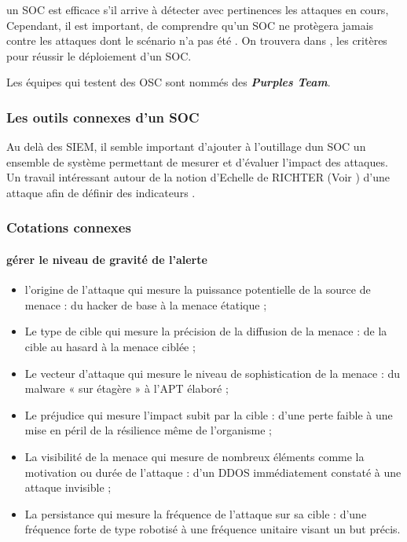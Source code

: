 
un SOC est efficace s’il arrive à détecter avec pertinences les attaques en cours,  Cependant, il est important, de comprendre qu’un SOC ne protègera jamais contre les attaques dont le scénario n'a pas été . On trouvera dans , les critères pour réussir le déploiement d'un SOC.

Les équipes qui testent des OSC sont nommés des \textbf{\textit{Purples Team}}.

\subsubsection{Les outils connexes d'un SOC}

Au delà des SIEM, il semble important d'ajouter à l'outillage dun SOC un ensemble de système permettant de mesurer et d'évaluer l'impact des attaques. Un travail intéressant autour de la notion d'Echelle de RICHTER (Voir  ) d'une attaque afin de définir des indicateurs .

\begin{frame}
\frametitle<presentation>{Cotations connexes	}
\framesubtitle<presentation>{gérer le niveau de gravité de l'alerte}
\begin{itemize}
  \item l’origine de l’attaque qui mesure la puissance potentielle de la source de menace : du hacker de base à la menace étatique ;
  \item Le type de cible qui mesure la précision de la diffusion de la menace : de la cible au hasard à la menace ciblée ;
  \item Le vecteur d’attaque qui mesure le niveau de sophistication de la menace : du malware « sur étagère » à l’APT élaboré ;
   \item Le préjudice qui mesure l’impact subit par la cible : d’une perte faible à une mise en péril de la résilience même de l’organisme ;
  \item La visibilité de la menace qui mesure de nombreux éléments comme la motivation ou durée de l’attaque : d’un DDOS immédiatement constaté à une attaque invisible ;
  \item La persistance qui mesure la fréquence de l’attaque sur sa cible : d’une fréquence forte de type robotisé à une fréquence unitaire visant un but précis.
\end{itemize}
\end{frame}


